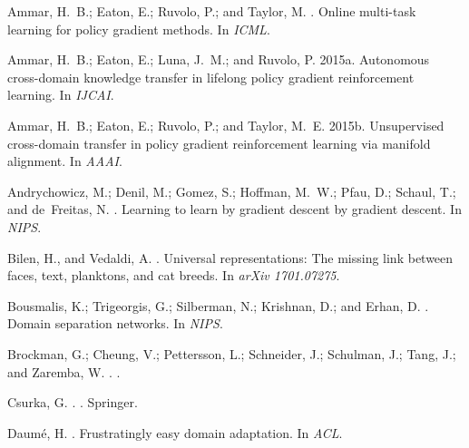 \documentclass[letterpaper]{article} \usepackage{aaai18}  \usepackage{times}  \usepackage{helvet}  \usepackage{courier}  \usepackage{url}  \usepackage{graphicx}  \usepackage{amsmath}
\begin{document}
{\clearpage
{
\begin{thebibliography}{}

Ammar, H.~B.; Eaton, E.; Ruvolo, P.; and Taylor, M.
.
\newblock Online multi-task learning for policy gradient methods.
\newblock In {\em ICML}.

Ammar, H.~B.; Eaton, E.; Luna, J.~M.; and Ruvolo, P.
\newblock 2015a.
\newblock Autonomous cross-domain knowledge transfer in lifelong policy
  gradient reinforcement learning.
\newblock In {\em IJCAI}.

Ammar, H.~B.; Eaton, E.; Ruvolo, P.; and Taylor, M.~E.
\newblock 2015b.
\newblock Unsupervised cross-domain transfer in policy gradient reinforcement
  learning via manifold alignment.
\newblock In {\em AAAI}.

Andrychowicz, M.; Denil, M.; Gomez, S.; Hoffman, M.~W.; Pfau, D.; Schaul, T.;
  and de~Freitas, N.
.
\newblock Learning to learn by gradient descent by gradient descent.
\newblock In {\em NIPS}.

Bilen, H., and Vedaldi, A.
.
\newblock Universal representations: The missing link between faces, text,
  planktons, and cat breeds.
\newblock In {\em arXiv 1701.07275}.

Bousmalis, K.; Trigeorgis, G.; Silberman, N.; Krishnan, D.; and Erhan, D.
.
\newblock Domain separation networks.
\newblock In {\em NIPS}.

Brockman, G.; Cheung, V.; Pettersson, L.; Schneider, J.; Schulman, J.; Tang,
  J.; and Zaremba, W.
.
.

Csurka, G.
.
.
\newblock Springer.

Daum{\'e}, H.
.
\newblock Frustratingly easy domain adaptation.
\newblock In {\em ACL}.


\end{thebibliography}}}
\end{document}
